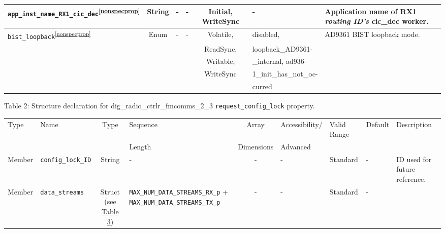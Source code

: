 \documentclass{article}
\def\comp{dig\_radio\_ctrlr\_fmcomms\_2\_3}
\begin{document}
\begin{landscape}
\begin{scriptsize}
\begin{longtable}{|p{5.16cm}|c|p{3.5cm}|p{3.4cm}|c|p{2.1cm}|p{3.75cm}|}
			\hline
			\verb+app_inst_name_RX1_cic_dec+\textsuperscript{\ref{nonspecprop}}    & String & - & - & Initial, WriteSync & -       & Application name of RX1 \textit{routing ID's} cic\_dec worker.\\
			\hline
			\verb+bist_loopback+\textsuperscript{\ref{nonspecprop}}    & Enum & - & - & Volatile, & disabled, & AD9361 BIST loopback mode. \\
       & & & & ReadSync, & loopback\_AD9361- & \\
       & & & & Writable, & \_internal, ad936- & \\
       & & & & WriteSync & 1\_init\_has\_not\_oc- & \\
       & & & &           & curred & \\
			\hline
		\end{longtable}
	\end{scriptsize}


	\noindent Table \hypertarget{tab2}{2}: Structure declaration for \comp{} \verb+request_config_lock+ property.
	\begin{scriptsize}
		\noindent\begin{longtable}{|p{1.8cm}|p{3.6cm}|c|p{4cm}|c|p{2cm}|p{1.7cm}|p{0.8cm}|p{3.10cm}|}
			\hline
			\rowcolor{blue}
			Type         & Name                                & Type & Sequence & Array      & Accessibility/ & Valid Range  & Default & Description                                                                                                                                                                                                                       \\
			\rowcolor{blue}
			             &                                     &      & Length   & Dimensions & Advanced       &              &         &                                                                                                                                                                                                                             \\
			\hline
			Member       & \verb+config_lock_ID+               & String& -       & -          & -              & Standard     & -       & ID used for future reference. \\
			\hline
			Member       & \verb+data_streams+                 & Struct (see \hyperlink{tab3}{Table 3}) & \verb+MAX_NUM_DATA_STREAMS_RX_p+ + \verb+MAX_NUM_DATA_STREAMS_TX_p+ & - & - & Standard & - & \\
			\hline
		\end{longtable}
	\end{scriptsize}


\end{landscape}
\end{document}
